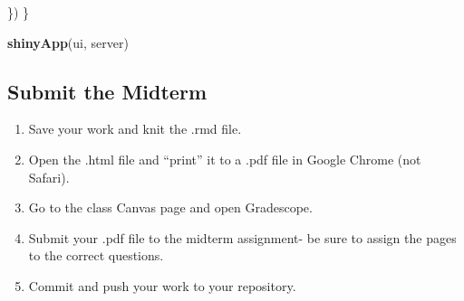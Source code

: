\documentclass[
]{article}
\newenvironment{Shaded}{\begin{snugshade}}{\end{snugshade}}
\newcommand{\FunctionTok}[1]{\textcolor[rgb]{0.13,0.29,0.53}{\textbf{#1}}}
\newcommand{\NormalTok}[1]{#1}
\providecommand{\tightlist}{%
  \setlength{\itemsep}{0pt}\setlength{\parskip}{0pt}}
\begin{document}
\begin{Shaded}
\begin{Highlighting}[]
\NormalTok{  \})}
\NormalTok{\}}

\FunctionTok{shinyApp}\NormalTok{(ui, server)}
\end{Highlighting}
\end{Shaded}

\subsection{Submit the Midterm}\label{submit-the-midterm}

\begin{enumerate}
\def\labelenumi{\arabic{enumi}.}
\tightlist
\item
  Save your work and knit the .rmd file.\\
\item
  Open the .html file and ``print'' it to a .pdf file in Google Chrome
  (not Safari).\\
\item
  Go to the class Canvas page and open Gradescope.\\
\item
  Submit your .pdf file to the midterm assignment- be sure to assign the
  pages to the correct questions.\\
\item
  Commit and push your work to your repository.
\end{enumerate}
\end{document}
